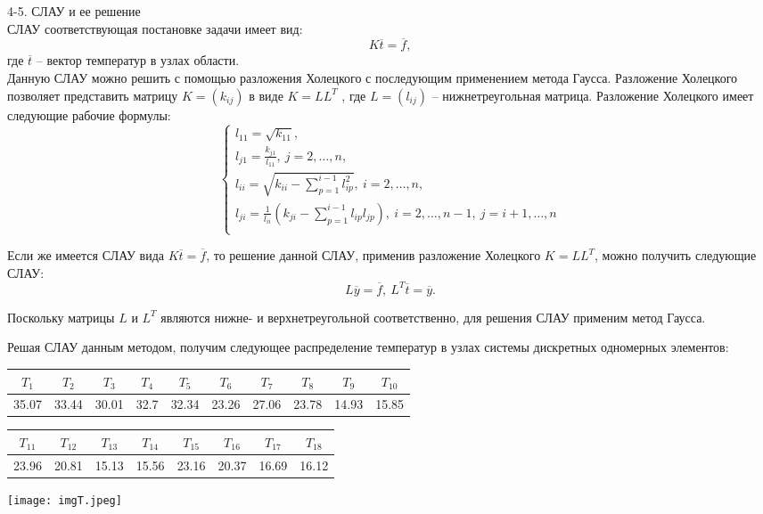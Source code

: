 \documentclass[a4paper, 12pt]{article}
\begin{document}
\newpage

4-5. СЛАУ и ее решение \\

СЛАУ соответствующая постановке задачи имеет вид:
\[K \overline t = \overline f,\]
где $\overline t$ – вектор температур в узлах области. \\

Данную СЛАУ можно решить с помощью разложения
Холецкого с последующим применением метода Гаусса. 
Разложение Холецкого позволяет представить матрицу $K = (k_{ij})$ в виде $K=LL^T$ , где $L = (l_{ij})$ – нижнетреугольная матрица. Разложение Холецкого имеет следующие рабочие формулы:
\[
\begin{cases}
l_{11} = \sqrt{k_{11}},\\
l_{j1} = \frac{k_{j1}}{l_{11}},\ j = 2, \dots, n,\\
l_{ii} = \sqrt{k_{ii} - \sum \limits_{p=1}^{i-1} l_{ip}^2}, \ i = 2, \dots, n,\\
l_{ji} = \frac{1}{l_{ii}} \left( k_{ji} - \sum \limits_{p=1}^{i-1} l_{ip} l_{jp} \right),\ i = 2, \dots, n-1,\ j = i+1, \dots, n\\
\end{cases}
\]

Если же имеется СЛАУ вида $K \overline t = \overline f$, то решение данной СЛАУ, применив разложение
Холецкого $K=LL^T$, можно получить следующие СЛАУ:
\[L \overline y = \overline f,\ L^T \overline t = \overline y.\]

Поскольку матрицы $L$ и $L^T$ являются нижне- и верхнетреугольной соответственно, для решения
СЛАУ применим метод Гаусса.

Решая СЛАУ данным методом, получим следующее распределение температур в узлах системы дискретных одномерных элементов:

\begin{table}[h]
    \centering
    \begin{tabular}{|c|c|c|c|c|c|c|c|c|c|}
        \toprule
        $T_1$&$T_2$&$T_3$&$T_4$&$T_5$&$T_6$&$T_7$&$T_8$&$T_9$&$T_{10}$\\ 
        \midrule
        35.07& 33.44& 30.01& 32.7 & 32.34& 23.26& 27.06& 23.78& 14.93& 15.85 \\ 
  \bottomrule	
    \end{tabular}
\end{table}
\begin{table}[h]
    \centering
    \begin{tabular}{|c|c|c|c|c|c|c|c|}
        \toprule
        $T_{11}$&$T_{12}$&$T_{13}$&$T_{14}$&$T_{15}$&$T_{16}$&$T_{17}$&$T_{18}$\\ 
        \midrule
        23.96& 20.81& 15.13& 15.56& 23.16& 20.37& 16.69& 16.12 \\ 
  \bottomrule
    \end{tabular}
\end{table}

\begin{center}
\texttt{[image: imgT.jpeg]}
\end{center}
\end{document}
